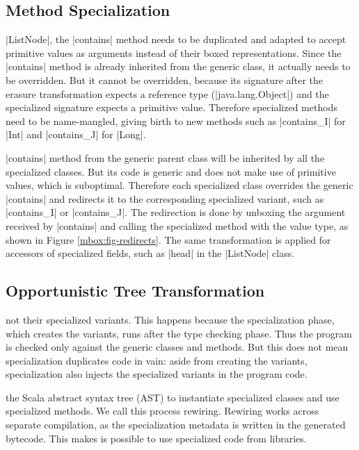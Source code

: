 \subsection{Method Specialization}
\label{mbox:subsec-spec-method}

 |ListNode|, the |contains| method needs to be duplicated and adapted to accept primitive values as arguments instead of their boxed representations. Since the |contains| method is already inherited from the generic class, it actually needs to be overridden. But it cannot be overridden, because its signature after the erasure \cite{java-erasure} transformation expects a reference type (|java.lang.Object|) and the specialized signature expects a primitive value. Therefore specialized methods need to be name-mangled, giving birth to new methods such as |contains_I| for |Int| and |contains_J| for |Long|.

 |contains| method from the generic parent class will be inherited by all the specialized classes. But its code is generic and does not make use of primitive values, which is suboptimal. Therefore each specialized class overrides the generic |contains| and redirects it to the corresponding specialized variant, such as |contains_I| or |contains_J|. The redirection is done by unboxing the argument received by |contains| and calling the specialized method with the value type, as shown in Figure \ref{mbox:fig-redirects}. The same transformation is applied for accessors of specialized fields, such as |head| in the |ListNode| class.

\subsection{Opportunistic Tree Transformation}
\label{mbox:subsec-spec-rewiring}

 not their specialized variants. This happens because the specialization phase, which creates the variants, runs after the type checking phase. Thus the program is checked only against the generic classes and methods. But this does not mean specialization duplicates code in vain: aside from creating the variants, specialization also injects the specialized variants in the program code.

 the Scala abstract syntax tree (AST) to instantiate specialized classes and use specialized methods. We call this process rewiring. Rewiring works across separate compilation, as the specialization metadata is written in the generated bytecode. This makes is possible to use specialized code from libraries.

